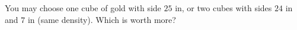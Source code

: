 You may choose one cube of gold with side $25$ in, or two cubes with sides $24$ in and $7$ in (same density). Which is worth more?
